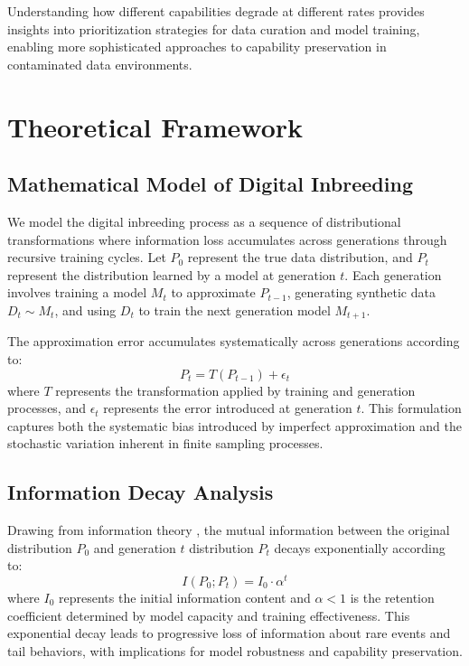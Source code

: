 \documentclass{article}
\begin{document}
Understanding how different capabilities degrade at different rates provides insights into prioritization strategies for data curation and model training, enabling more sophisticated approaches to capability preservation in contaminated data environments.

\section{Theoretical Framework}

\subsection{Mathematical Model of Digital Inbreeding}

We model the digital inbreeding process as a sequence of distributional transformations where information loss accumulates across generations through recursive training cycles. Let $P_0$ represent the true data distribution, and $P_t$ represent the distribution learned by a model at generation $t$. Each generation involves training a model $M_t$ to approximate $P_{t-1}$, generating synthetic data $D_t \sim M_t$, and using $D_t$ to train the next generation model $M_{t+1}$.

The approximation error accumulates systematically across generations according to:
\begin{equation}
P_t = T(P_{t-1}) + \epsilon_t
\end{equation}
where $T$ represents the transformation applied by training and generation processes, and $\epsilon_t$ represents the error introduced at generation $t$. This formulation captures both the systematic bias introduced by imperfect approximation and the stochastic variation inherent in finite sampling processes.

\subsection{Information Decay Analysis}

Drawing from information theory \cite{cover1999elements}, the mutual information between the original distribution $P_0$ and generation $t$ distribution $P_t$ decays exponentially according to:
\begin{equation}
I(P_0; P_t) = I_0 \cdot \alpha^t
\end{equation}
where $I_0$ represents the initial information content and $\alpha < 1$ is the retention coefficient determined by model capacity and training effectiveness. This exponential decay leads to progressive loss of information about rare events and tail behaviors, with implications for model robustness and capability preservation.
\end{document}
